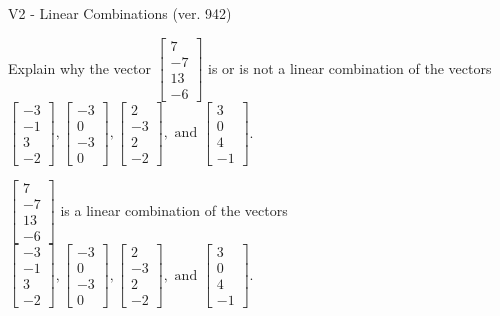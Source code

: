 \begin{exercise}
  \begin{exerciseTitle}V2 - Linear Combinations (ver. 942)\end{exerciseTitle}
  \begin{exerciseStatement}
    Explain why the vector \(\left[\begin{array}{c}
7 \\
-7 \\
13 \\
-6
\end{array}\right]\)  is or is not a linear 
	combination of the vectors \(\left[\begin{array}{c}
-3 \\
-1 \\
3 \\
-2
\end{array}\right] , \left[\begin{array}{c}
-3 \\
0 \\
-3 \\
0
\end{array}\right] , \left[\begin{array}{c}
2 \\
-3 \\
2 \\
-2
\end{array}\right] , \text{ and } \left[\begin{array}{c}
3 \\
0 \\
4 \\
-1
\end{array}\right]\).
	


  \end{exerciseStatement}
  \begin{exerciseAnswer}
   \(\left[\begin{array}{c}
7 \\
-7 \\
13 \\
-6
\end{array}\right]\) 
  	 is  
	a linear combination of the vectors \(\left[\begin{array}{c}
-3 \\
-1 \\
3 \\
-2
\end{array}\right] , \left[\begin{array}{c}
-3 \\
0 \\
-3 \\
0
\end{array}\right] , \left[\begin{array}{c}
2 \\
-3 \\
2 \\
-2
\end{array}\right] , \text{ and } \left[\begin{array}{c}
3 \\
0 \\
4 \\
-1
\end{array}\right]\).


\end{exerciseAnswer}
\end{exercise}
